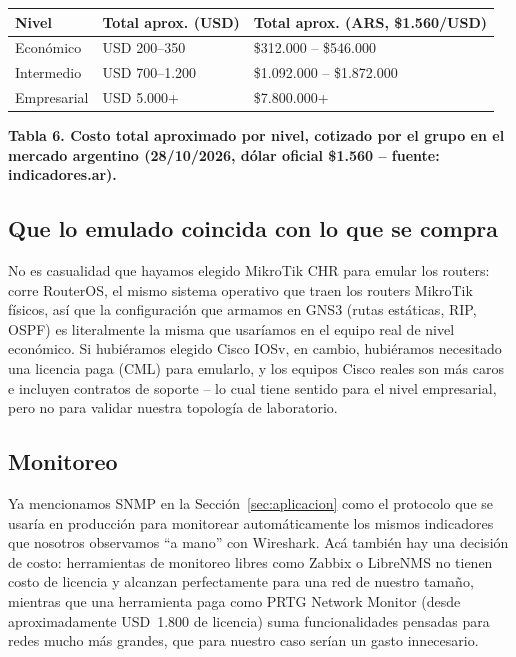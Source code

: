 \documentclass[11pt,a4paper]{article}
\newcommand{\figcaption}[1]{\par\noindent\footnotesize\textbf{#1}\par\vspace{0.4cm}}
\begin{document}
\needspace{1cm}
\begin{center}
\begin{minipage}{0.96\linewidth}
\centering
\small
\begin{tabular}{@{}p{3.6cm}p{4.2cm}p{4.2cm}@{}}
\toprule
\textbf{Nivel} & \textbf{Total aprox. (USD)} & \textbf{Total aprox. (ARS, \$1.560/USD)} \\
\midrule
Econ\'omico & USD 200--350 & \$312.000 -- \$546.000 \\
Intermedio & USD 700--1.200 & \$1.092.000 -- \$1.872.000 \\
Empresarial & USD 5.000+ & \$7.800.000+ \\
\bottomrule
\end{tabular}
\par\vspace{0.1cm}
\figcaption{Tabla 6. Costo total aproximado por nivel, cotizado por el grupo en el mercado argentino (28/10/2026, d\'olar oficial \$1.560 -- fuente: indicadores.ar).}
\end{minipage}
\end{center}

\subsection*{Que lo emulado coincida con lo que se compra}

No es casualidad que hayamos elegido MikroTik CHR para emular los routers: corre RouterOS, el mismo sistema operativo que traen los routers MikroTik f\'isicos, as\'i que la configuraci\'on que armamos en GNS3 (rutas est\'aticas, RIP, OSPF) es literalmente la misma que usar\'iamos en el equipo real de nivel econ\'omico. Si hubi\'eramos elegido Cisco IOSv, en cambio, hubi\'eramos necesitado una licencia paga (CML) para emularlo, y los equipos Cisco reales son m\'as caros e incluyen contratos de soporte -- lo cual tiene sentido para el nivel empresarial, pero no para validar nuestra topolog\'ia de laboratorio.

\subsection*{Monitoreo}

Ya mencionamos SNMP en la Secci\'on~\ref{sec:aplicacion} como el protocolo que se usar\'ia en producci\'on para monitorear autom\'aticamente los mismos indicadores que nosotros observamos ``a mano'' con Wireshark. Ac\'a tambi\'en hay una decisi\'on de costo: herramientas de monitoreo libres como Zabbix o LibreNMS no tienen costo de licencia y alcanzan perfectamente para una red de nuestro tama\~no, mientras que una herramienta paga como PRTG Network Monitor (desde aproximadamente USD~1.800 de licencia) suma funcionalidades pensadas para redes mucho m\'as grandes, que para nuestro caso ser\'ian un gasto innecesario.
\end{document}
